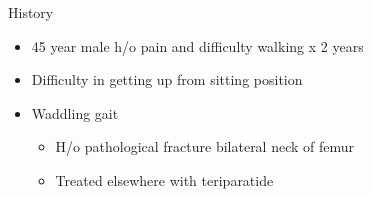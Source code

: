 \begin{frame}{History}
\begin{itemize}
	\item 45 year male h/o pain and difficulty walking x 2 years
	\item Difficulty in getting up from sitting position
	\item Waddling gait 
    \begin{itemize}	
		\item H/o pathological fracture bilateral neck of femur
        \item Treated elsewhere with teriparatide
    \end{itemize}
\end{itemize}
\end{frame}

